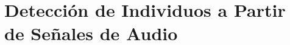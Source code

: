 \chapter{Detección de Individuos a Partir de Señales de Audio}\label{chapter: VRP}


























